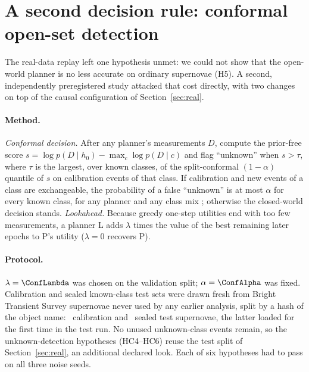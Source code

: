 \section{A second decision rule: conformal open-set detection}\label{sec:conf}
The real-data replay left one hypothesis unmet: we could not show that the open-world planner is no less accurate on ordinary supernovae (H5). A second, independently preregistered study attacked that cost directly, with two changes on top of the causal configuration of Section~\ref{sec:real}.

\paragraph{Method.} \emph{Conformal decision.} After any planner's measurements $D$, compute the prior-free score $s=\log p(D\mid h_0)-\max_c\log p(D\mid c)$ and flag ``unknown'' when $s>\tau$, where $\tau$ is the largest, over known classes, of the split-conformal $(1-\alpha)$ quantile of $s$ on calibration events of that class. If calibration and new events of a class are exchangeable, the probability of a false ``unknown'' is at most $\alpha$ for every known class, for any planner and any class mix \citep{Vovk2005,Angelopoulos2023}; otherwise the closed-world decision stands. \emph{Lookahead.} Because greedy one-step utilities end with too few measurements, a planner L adds $\lambda$ times the value of the best remaining later epochs to P's utility ($\lambda=0$ recovers P).

\paragraph{Protocol.} $\lambda=\ConfLambda$ was chosen on the validation split; $\alpha=\ConfAlpha$ was fixed. Calibration and sealed known-class test sets were drawn fresh from Bright Transient Survey supernovae never used by any earlier analysis, split by a hash of the object name: \ConfNCal\ calibration and \ConfNFresh\ sealed test supernovae, the latter loaded for the first time in the test run. No unused unknown-class events remain, so the unknown-detection hypotheses (HC4--HC6) reuse the test split of Section~\ref{sec:real}, an additional declared look. Each of six hypotheses had to pass on all three noise seeds.

\begin{table}[t]
\centering\scriptsize
\caption{Conformal open-set study, preregistered results per noise seed: estimate [95\% CI]; $^\times$ = criterion not met. Primary system: lookahead planner L with the conformal decision (C-L). $\Delta$: C-L minus closed-world EIG (B3), except HC6 (AUROC of $s$, L minus P). HC1 uses Clopper--Pearson intervals; HC2--HC4 and HC6 paired bootstrap.}
\label{tab:conf}

\end{table}

